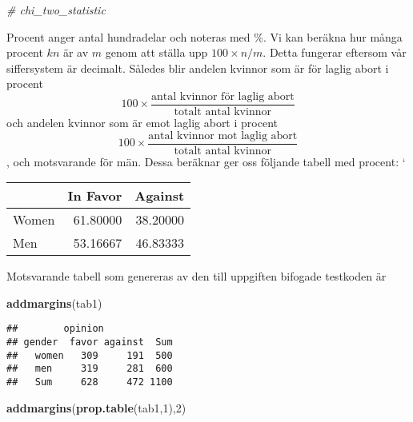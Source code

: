 \documentclass[]{article}
\newenvironment{Shaded}{\begin{snugshade}}{\end{snugshade}}
\newcommand{\CommentTok}[1]{\textcolor[rgb]{0.56,0.35,0.01}{\textit{#1}}}
\newcommand{\DecValTok}[1]{\textcolor[rgb]{0.00,0.00,0.81}{#1}}
\newcommand{\KeywordTok}[1]{\textcolor[rgb]{0.13,0.29,0.53}{\textbf{#1}}}
\newcommand{\NormalTok}[1]{#1}
\newcommand{\OperatorTok}[1]{\textcolor[rgb]{0.81,0.36,0.00}{\textbf{#1}}}
\newcommand{\StringTok}[1]{\textcolor[rgb]{0.31,0.60,0.02}{#1}}
\begin{document}
\begin{Shaded}
\begin{Highlighting}[]
\CommentTok{# chi_two_statistic }
\end{Highlighting}
\end{Shaded}

Procent anger antal hundradelar och noteras med \%. Vi kan beräkna hur
många procent \(kn\) är av \(m\) genom att ställa upp
\(100 \times n/m\). Detta fungerar eftersom vår siffersystem är
decimalt. Således blir andelen kvinnor som är för laglig abort i procent
\[100 \times \frac{\text{antal kvinnor för laglig abort}}{\text{totalt antal kvinnor}}\]
och andelen kvinnor som är emot laglig abort i procent
\[100 \times \frac{\text{antal kvinnor mot laglig abort}}{\text{totalt antal kvinnor}}\],
och motsvarande för män. Dessa beräknar ger oss följande tabell med
procent: `

\begin{Shaded}
\end{Shaded}

\begin{longtable}[]{@{}lrr@{}}
\toprule
& In Favor & Against\tabularnewline
\midrule
\endhead
Women & 61.80000 & 38.20000\tabularnewline
Men & 53.16667 & 46.83333\tabularnewline
\bottomrule
\end{longtable}

Motsvarande tabell som genereras av den till uppgiften bifogade
testkoden är

\begin{Shaded}
\begin{Highlighting}[]
\KeywordTok{addmargins}\NormalTok{(tab1)}
\end{Highlighting}
\end{Shaded}

\begin{verbatim}
##        opinion
## gender  favor against  Sum
##   women   309     191  500
##   men     319     281  600
##   Sum     628     472 1100
\end{verbatim}

\begin{Shaded}
\begin{Highlighting}[]
\KeywordTok{addmargins}\NormalTok{(}\KeywordTok{prop.table}\NormalTok{(tab1,}\DecValTok{1}\NormalTok{),}\DecValTok{2}\NormalTok{) }
\end{Highlighting}
\end{Shaded}
\end{document}
